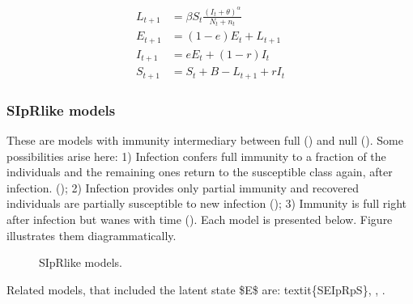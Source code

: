 \documentclass[letterpaper,10pt,english]{sphinxmanual}
\begin{document}
\label{equation:intromodels:E:SEISmodel}\begin{align}
        L_{t+1} &= \beta S_t \frac{(I_t+\theta)^\alpha} {N_t+n_t}\nonumber \\
    E_{t+1} &= (1-e) E_t + L_{t+1}\nonumber\\
        I_{t+1} &= e E_t + (1-r)I_t\nonumber\\
        S_{t+1} &= S_t + B - L_{t+1} + r I_t\nonumber
\end{align}

\subsubsection{SIpR\sphinxhyphen{}like models}
\label{\detokenize{intromodels:sipr-like-models}}
These are  models with immunity intermediary between full () and null ().
Some possibilities arise here: 1) Infection confers full immunity to a fraction of the individuals and the remaining ones return to the susceptible class again, after infection. (); 2) Infection provides only partial immunity and recovered individuals are partially susceptible to new infection (); 3) Immunity is full right after infection but wanes with time (). Each model is presented below. Figure  illustrates them diagrammatically.

\begin{figure}[htbp]
\centering
\capstart

\noindent{}
\caption{SIpR\sphinxhyphen{}like models.}\label{\detokenize{intromodels:id2}}\end{figure}

Related models, that included the latent state \$E\$ are: textit\{SEIpRpS\}, , .
\end{document}
